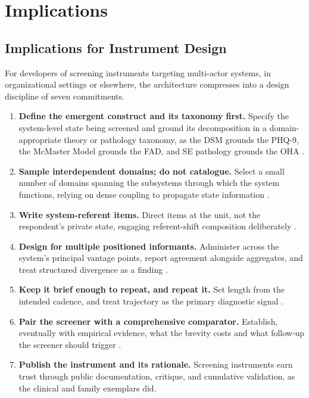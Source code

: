 \documentclass[12pt, letterpaper]{article}
\begin{document}
\section{Implications}
\label{sec:implications}

\subsection{Implications for Instrument Design}
\label{sec:design-implications}

For developers of screening instruments targeting multi-actor systems, in organizational settings or elsewhere, the architecture compresses into a design discipline of seven commitments.

\begin{enumerate}[nosep]
    \item \textbf{Define the emergent construct and its taxonomy first.} Specify the system-level state being screened and ground its decomposition in a domain-appropriate theory or pathology taxonomy, as the DSM grounds the PHQ-9, the McMaster Model grounds the FAD, and SE pathology grounds the OHA \parencite{kroenke2001,epstein1978,davidz2018}.
    \item \textbf{Sample interdependent domains; do not catalogue.} Select a small number of domains spanning the subsystems through which the system functions, relying on dense coupling to propagate state information \parencite{borsboom2017}.
    \item \textbf{Write system-referent items.} Direct items at the unit, not the respondent's private state, engaging referent-shift composition deliberately \parencite{chan1998}.
    \item \textbf{Design for multiple positioned informants.} Administer across the system's principal vantage points, report agreement alongside aggregates, and treat structured divergence as a finding \parencite{james1984,lebreton2008,delosreyes2005}.
    \item \textbf{Keep it brief enough to repeat, and repeat it.} Set length from the intended cadence, and treat trajectory as the primary diagnostic signal \parencite{stratton2014,vandeLeemput2014}.
    \item \textbf{Pair the screener with a comprehensive comparator.} Establish, eventually with empirical evidence, what the brevity costs and what follow-up the screener should trigger \parencite{kroenke2001}.
    \item \textbf{Publish the instrument and its rationale.} Screening instruments earn trust through public documentation, critique, and cumulative validation, as the clinical and family exemplars did.
\end{enumerate}
\end{document}
